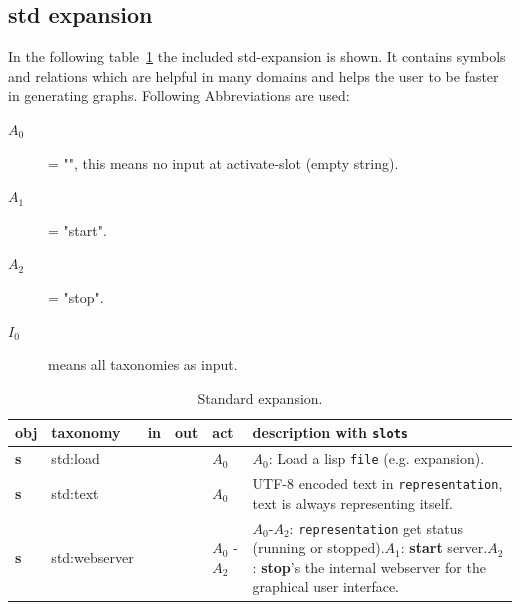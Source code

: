 \documentclass[a4paper, 12pt, openany]{scrbook}
\begin{document}
\subsection{std expansion}
In the following table~\ref{tab:standard-expansion} the included std-expansion is shown. It contains symbols and relations which are helpful in many domains and helps the user to be faster in generating graphs. Following Abbreviations are used:
\begin{description}
\item[$A_0$] = "", this means no input at activate-slot (empty string).
\item[$A_1$] = "start".
\item[$A_2$] = "stop".
\item[$I_0$] means all taxonomies as input.
\end{description}
\begin{table}[htbp]
\centering
\begin{tabular}{|p{1cm}|p{3cm}|p{1.5cm}|p{1.5cm}|p{1cm}|p{7cm}|}
  \hline
  \textbf{obj} & \textbf{taxonomy} & \textbf{in} & \textbf{out} & \textbf{act} & \textbf{description with \texttt{slots}} \\
  \hline
  \textbf{s} & std:load & & & $A_0$ & $A_0$: Load a lisp \texttt{file} (e.g. expansion). \\
  \hline
  \textbf{s} & std:text & & & $A_0$ & UTF-8 encoded text in \texttt{representation}, text is always representing itself. \\
  \hline
  \textbf{s} & std:webserver & & & $A_0$ - $A_2$ & $A_0$-$A_2$: \texttt{representation} get status (running or stopped).\newline $A_1$: \textbf{start} server.\newline $A_2$: \textbf{stop}'s the internal webserver for the graphical user interface. \\
  \hline
\end{tabular}
\caption{Standard expansion.}
\label{tab:standard-expansion}
\end{table}
\end{document}
